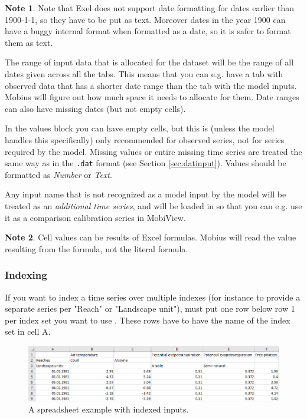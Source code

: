 \documentclass[11pt]{article}
\theoremstyle{definition}
\newtheorem{mynote}{Note}
\newenvironment{note}%
  {\begin{lrbox}{\notebox}%
   \begin{minipage}{\dimexpr\linewidth-2\fboxsep}
   \begin{mynote}}%
  {\end{mynote}%
   \end{minipage}%
   \end{lrbox}%
   \begin{trivlist}
     \item[]\colorbox{silver}{\usebox\notebox}
   \end{trivlist}}
\begin{document}
\begin{note}
Note that Exel does not support date formatting for dates earlier than 1900-1-1, so they have to be put as text. Moreover dates in the year 1900 can have a buggy internal format when formatted as a date, so it is safer to format them as text.
\end{note}

The range of input data that is allocated for the dataset will be the range of all dates given across all the tabs. This means that you can e.g. have a tab with observed data that has a shorter date range than the tab with the model inputs. Mobius will figure out how much space it needs to allocate for them. Date ranges can also have missing dates (but not empty cells).

In the values block you can have empty cells, but this is (unless the model handles this specifically) only recommended for observed series, not for series required by the model. Missing values or entire missing time series are treated the same way as in the {\tt .dat} format (see Section \ref{sec:datinput}). Values should be formatted as \emph{Number} or \emph{Text}.

Any input name that is not recognized as a model input by the model will be treated as an \emph{additional time series}, and will be loaded in so that you can e.g. use it as a comparison calibration series in MobiView.

\begin{note}
Cell values can be results of Excel formulas. Mobius will read the value resulting from the formula, not the literal formula.
\end{note}

\subsubsection{Indexing}

If you want to index a time series over multiple indexes (for instance to provide a separate series per "Reach" or "Landscape unit"), must put one row below row 1 per index set you want to use . These rows have to have the name of the index set in cell A.

\begin{figure}[h]\label{fig:excel-indexed}
\centering
\includegraphics[width=0.95\linewidth]{img/excel_indexes}
\caption{A spreadsheet example with indexed inputs.}
\end{figure}
\end{document}
